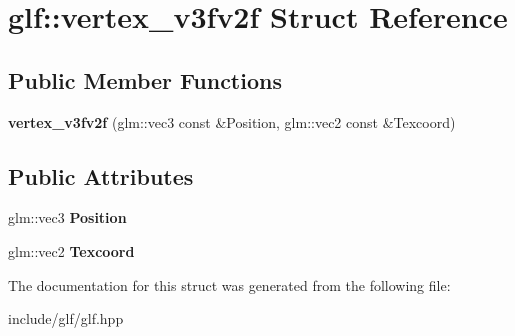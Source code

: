 \hypertarget{structglf_1_1vertex__v3fv2f}{\section{glf\-:\-:vertex\-\_\-v3fv2f Struct Reference}
\label{structglf_1_1vertex__v3fv2f}
}
\subsection*{Public Member Functions}
\begin{DoxyCompactItemize}
\item 
\hypertarget{structglf_1_1vertex__v3fv2f_ade3271f405e2e0ef2b81ba64d94c42af}{{\bfseries vertex\-\_\-v3fv2f} (glm\-::vec3 const \&Position, glm\-::vec2 const \&Texcoord)}\label{structglf_1_1vertex__v3fv2f_ade3271f405e2e0ef2b81ba64d94c42af}

\end{DoxyCompactItemize}
\subsection*{Public Attributes}
\begin{DoxyCompactItemize}
\item 
\hypertarget{structglf_1_1vertex__v3fv2f_a4b79b940f5c1b5a5e285fc4f00099d33}{glm\-::vec3 {\bfseries Position}}\label{structglf_1_1vertex__v3fv2f_a4b79b940f5c1b5a5e285fc4f00099d33}

\item 
\hypertarget{structglf_1_1vertex__v3fv2f_a7c2d96a701ab3fdad96ad6e0f1b5384e}{glm\-::vec2 {\bfseries Texcoord}}\label{structglf_1_1vertex__v3fv2f_a7c2d96a701ab3fdad96ad6e0f1b5384e}

\end{DoxyCompactItemize}


The documentation for this struct was generated from the following file\-:\begin{DoxyCompactItemize}
\item 
include/glf/glf.\-hpp\end{DoxyCompactItemize}
